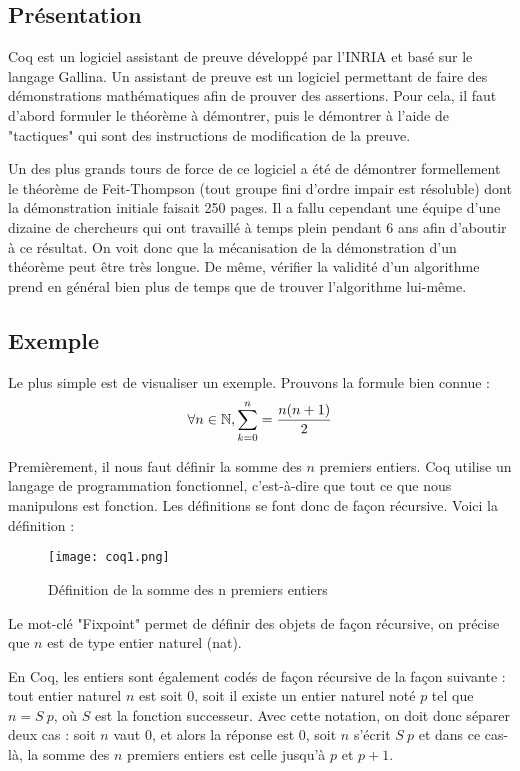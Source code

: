 \subsection{Présentation}

Coq est un logiciel assistant de preuve développé par l'INRIA et basé sur le langage Gallina. Un assistant de preuve est un logiciel permettant de faire des démonstrations mathématiques afin de prouver des assertions. Pour cela, il faut d'abord formuler le théorème à démontrer, puis le démontrer à l'aide de "tactiques" qui sont des instructions de modification de la preuve. 

Un des plus grands tours de force de ce logiciel a été de démontrer formellement le théorème de Feit-Thompson (tout groupe fini d'ordre impair est résoluble) dont la démonstration initiale faisait 250 pages. Il a fallu cependant une équipe d'une dizaine de chercheurs qui ont travaillé à temps plein pendant 6 ans afin d'aboutir à ce résultat. On voit donc que la mécanisation de la démonstration d'un théorème peut être très longue. De même, vérifier la validité d'un algorithme prend en général bien plus de temps que de trouver l'algorithme lui-même.

\subsection{Exemple}

Le plus simple est de visualiser un exemple. Prouvons la formule bien connue : $$\forall n\in \mathbb{N}, \sum_{k=0}^n = \frac{n(n+1)}{2}$$

Premièrement, il nous faut définir la somme des $n$ premiers entiers. Coq utilise un langage de programmation fonctionnel, c'est-à-dire que tout ce que nous manipulons est fonction. Les définitions se font donc de façon récursive. Voici la définition : 

\begin{figure}[!ht]
\centering
\texttt{[image: coq1.png]}
\caption{Définition de la somme des n premiers entiers}
\end{figure}

Le mot-clé "Fixpoint" permet de définir des objets de façon récursive, on précise que $n$ est de type entier naturel (nat). 

En Coq, les entiers sont également codés de façon récursive de la façon suivante : tout entier naturel $n$ est soit $0$, soit il existe un entier naturel noté $p$ tel que $n = S\ p$, où $S$ est la fonction successeur. Avec cette notation, on doit donc séparer deux cas : soit $n$ vaut $0$, et alors la réponse est $0$, soit $n$ s'écrit $S\ p$ et dans ce cas-là, la somme des $n$ premiers entiers est celle jusqu'à $p$ et $p+1$.

